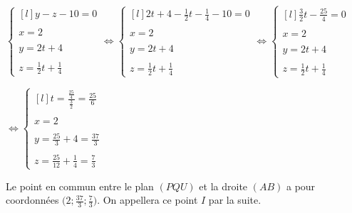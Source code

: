 \documentclass{article}
\begin{document}
\vspace{2mm}

$\left\{\begin{matrix*}[l]
   y - z -10 = 0\\
   \\
   x = 2\\
   \\
   y = 2t + 4\\
   \\
   z = \frac{1}{2}t+\frac{1}{4}
\end{matrix*}\right.
\Leftrightarrow
\left\{\begin{matrix*}[l]
   2t + 4 - \frac{1}{2}t - \frac{1}{4} - 10 = 0\\
   \\
   x = 2\\
   \\
   y = 2t + 4\\
   \\
   z = \frac{1}{2}t+\frac{1}{4}
\end{matrix*}\right.
\Leftrightarrow
\left\{\begin{matrix*}[l]
   \frac{3}{2}t - \frac{25}{4} = 0\\
   \\
   x = 2\\
   \\
   y = 2t + 4\\
   \\
   z = \frac{1}{2}t + \frac{1}{4}
\end{matrix*}\right.
$

\vspace{2mm}

$
\Leftrightarrow
\left\{\begin{matrix*}[l]
   t = \displaystyle\frac{\frac{25}{4}}{\frac{3}{2}} = \frac{25}{6}\\
   \\
   x = 2\\
   \\
   y = \displaystyle\frac{25}{3} + 4 = \frac{37}{3}\\
   \\
   z = \displaystyle\frac{25}{12} + \frac{1}{4} = \frac{7}{3}
\end{matrix*}\right.
$

\vspace{2mm}

\noindent Le point en commun entre le plan $(PQU)$ et la droite $(AB)$ a pour coordonnées $\Big(2; \displaystyle\frac{37}{3}; \frac{7}{3}\Big)$. On appellera ce point $I$ par la suite.
\end{document}
